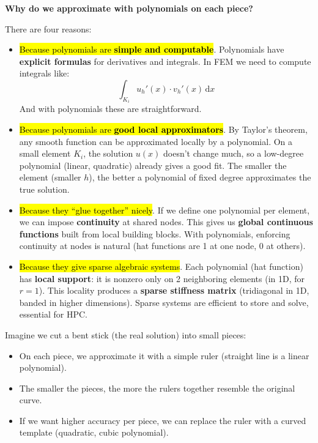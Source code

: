 \highspace
\begin{flushleft}
    \textcolor{Green3}{ \textbf{Why do we approximate with polynomials on each piece?}}
    \label{label: why do we approximate with polynomials on each piece}
\end{flushleft}
There are four reasons:
\begin{itemize}
    \item \hl{Because polynomials are \textbf{simple and computable}}. Polynomials have \textbf{explicit formulas} for derivatives and integrals. In FEM we need to compute integrals like:
    \begin{equation*}
        \displaystyle\int_{K_{i}} u_{h}'(x) \cdot v_{h}'(x) \,\mathrm{d}x
    \end{equation*}
    And with polynomials these are straightforward.
    \item \hl{Because polynomials are \textbf{good local approximators}}. By Taylor's theorem, any smooth function can be approximated locally by a polynomial. On a small element $K_{i}$, the solution $u(x)$ doesn't change much, so a low-degree polynomial (linear, quadratic) already gives a good fit. The smaller the element (smaller $h$), the better a polynomial of fixed degree approximates the true solution.
    \item \hl{Because they ``glue together'' nicely}. If we define one polynomial per element, we can impose \textbf{continuity} at shared nodes. This gives us \textbf{global continuous functions} built from local building blocks. With polynomials, enforcing continuity at nodes is natural (hat functions are 1 at one node, 0 at others).
    \item \hl{Because they give sparse algebraic systems}. Each polynomial (hat function) has \textbf{local support}: it is nonzero only on 2 neighboring elements (in 1D, for $r=1$). This locality produces a \textbf{sparse stiffness matrix} (tridiagonal in 1D, banded in higher dimensions). Sparse systems are efficient to store and solve, essential for HPC.
\end{itemize}
\begin{examplebox}
    Imagine we cut a bent stick (the real solution) into small pieces:
    \begin{itemize}
        \item On each piece, we approximate it with a simple ruler (straight line is a linear polynomial).
        \item The smaller the pieces, the more the rulers together resemble the original curve.
        \item If we want higher accuracy per piece, we can replace the ruler with a curved template (quadratic, cubic polynomial).
    \end{itemize}
\end{examplebox}

